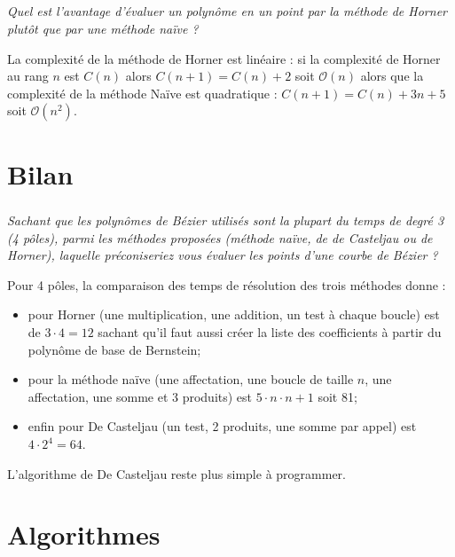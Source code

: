 \documentclass[10pt,fleqn]{article} %
\begin{document}
\subparagraph{}
\textit{Quel  est l'avantage d'évaluer un polynôme en un point par la méthode de Horner plutôt que par une méthode naïve ?}
\ifprof
\begin{corrige}
La complexité de la méthode de Horner est linéaire : si la complexité de Horner au rang $n$ est $C(n)$ alors $C(n+1)=C(n)+2$ soit $\mathcal{O}(n)$
alors que la complexité de la méthode Naïve est quadratique : $C(n+1)=C(n)+3n+5$ soit $\mathcal{O}\left(n^2\right)$.
\end{corrige}
\else
\fi

\section{Bilan}
\subparagraph{}
\textit{Sachant que les polynômes de Bézier utilisés sont la plupart du temps de degré 3 (4 pôles), parmi les méthodes proposées (méthode naïve, de de Casteljau ou de Horner), laquelle préconiseriez vous évaluer les points d'une courbe de Bézier ?}

\ifprof
\begin{corrige}
Pour 4 pôles, la comparaison des temps de résolution des trois méthodes donne : 
\begin{itemize}
\item pour Horner (une multiplication, une addition, un test à chaque boucle) est de $3\cdot 4=12$ sachant qu'il faut aussi créer la liste des coefficients à partir du polynôme de base de Bernstein;
\item pour la méthode naïve (une affectation, une boucle de taille $n$, une affectation, une somme et 3 produits) est $5\cdot n\cdot n+1$ soit 81;
\item enfin pour De Casteljau (un test, 2 produits, une somme par appel) est $4\cdot 2^4=64$.
\end{itemize}

L'algorithme de De Casteljau reste plus simple à programmer.
\end{corrige}
\else
\fi
\ifprof
\else
\newpage


\section*{Algorithmes}
\end{document}
